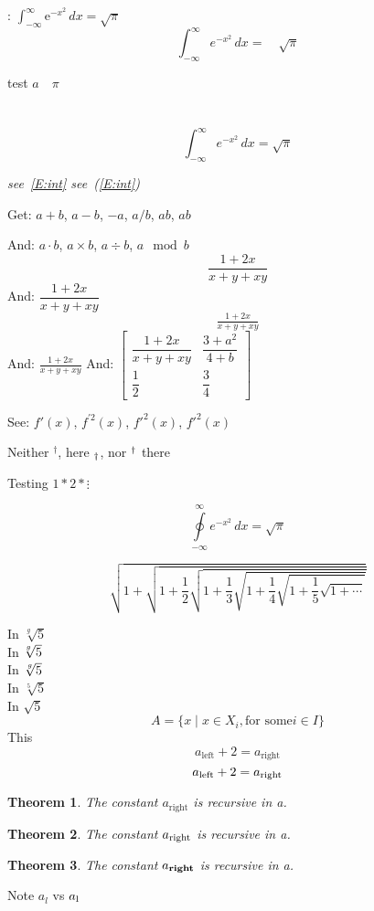 \documentclass{amsart}
\numberwithin{equation}{section}
\newtheorem{thm}{Theorem}
\begin{document}
: \begin{math}\int_{-\infty}^\infty \mathrm{e}^{-x^2}\,dx = \sqrt\pi\end{math}
\[
    \int_{-\infty}^\infty e^{-x^2}\,dx =\quad \sqrt\pi
\]

test $a \quad\pi$

\section{}
\begin{equation}
    \label{E:int}
    \int_{-\infty}^\infty e^{-x^2}\,dx = \sqrt\pi
\end{equation}

{\itshape see~\eqref{E:int} see~(\ref{E:int})}

Get: $a + b$, $a - b$, $-a$, $a / b$, $a b$, $ab$

And: $a \cdot b$, $a \times b$, $a \div b$, $a \mod b$
\[
    \frac{1 + 2x}{x + y + xy}
\]
And: $\dfrac{1 + 2x}{x + y + xy}$
\[
    \tfrac{1 + 2x}{x + y + xy}
\]
And: $\frac{1 + 2x}{x + y + xy}$
And: $\begin{bmatrix}\dfrac{1 + 2x}{x + y + xy}&\dfrac{3 + a^2}{4+b}\\\dfrac{1}{2}&\dfrac{3}{4}\end{bmatrix}$

See: $f'(x)$, $f^{\prime 2}(x)$, $f'^2(x)$, ${f'}^2(x)$

Neither ${}^\dagger$, here $\sb\dagger$, nor $\sp\dagger$ there

Testing $1 * 2 * \vdots$

\[
    \oint\limits_{-\infty}^\infty e^{-x^2}\,dx = \sqrt\pi
\]

\[
    \sqrt{1+\sqrt{1 + \frac{1}{2}\sqrt{1 + \frac{1}{3}\sqrt{1 + \frac{1}{4}\sqrt{1 + \frac{1}{5}\sqrt{1 + \cdots}}}}}}
\]

\noindent
In $\sqrt[g]5$\\
In $\sqrt[\leftroot2 \uproot2 g]5$\\
In $\sqrt[\uproot2 g]5$\\
In $\sqrt[5]5$\\
In $\sqrt5$
\[
    A = \{ x \mid x \in X_i, \text {for some} i \in I \}
\]
This
\[
    a_{\text{left}} + 2 = a_{\text{right}}
\]
\[
    a_{\textnormal{left}} + 2 = a_{\text{right}}
\]

\begin{thm}
    The constant $a_{\text{right}}$ is recursive in a.
\end{thm}
\begin{thm}
    The constant $a_{\text{\upshape right}}$ is recursive in a.
\end{thm}
\begin{thm}
    The constant $a_{\text{\bfseries right}}$ is recursive in a.
\end{thm}

Note $a_l$ vs $a_{\text l}$
\end{document}

